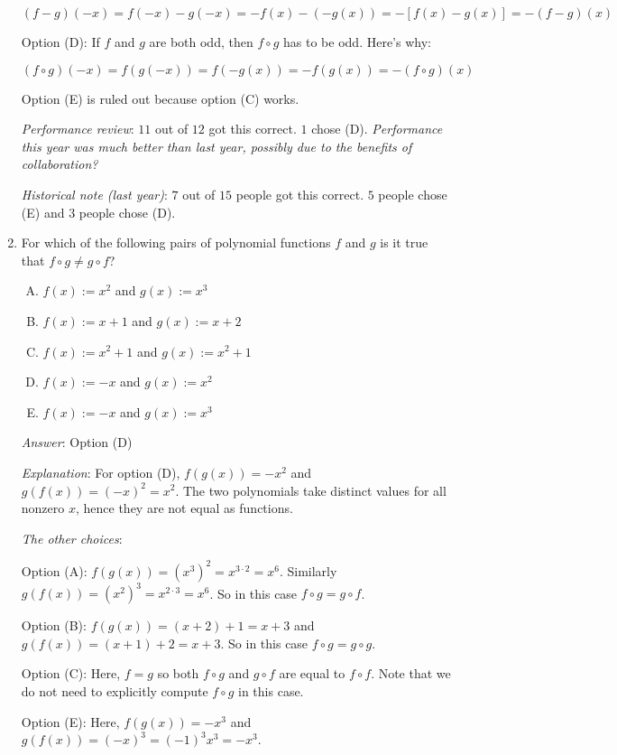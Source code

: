 \documentclass[10pt]{amsart}
\begin{document}
\begin{enumerate}
  $$(f - g)(-x) = f(-x) - g(-x) = -f(x) - (-g(x)) = -[f(x) - g(x)] = -(f - g)(x)$$

  Option (D): If $f$ and $g$ are both odd, then $f \circ g$ has to be
  odd. Here's why:

  $$(f \circ g)(-x) = f(g(-x)) = f(-g(x)) = -f(g(x)) = -(f \circ g)(x)$$

  Option (E) is ruled out because option (C) works.

  {\em Performance review}: $11$ out of $12$ got this correct. $1$
  chose (D). {\em Performance this year was much better than last
  year, possibly due to the benefits of collaboration?}

  {\em Historical note (last year)}: $7$ out of $15$ people got this
  correct. $5$ people chose (E) and $3$ people chose (D).

\item For which of the following pairs of polynomial functions $f$ and
  $g$ is it true that $f \circ g \ne g \circ f$?

  \begin{enumerate}[(A)]
  \item $f(x) := x^2$ and $g(x) := x^3$
  \item $f(x) := x + 1$ and $g(x) := x + 2$
  \item $f(x) := x^2 + 1$ and $g(x) := x^2 + 1$
  \item $f(x) := -x$ and $g(x) := x^2$
  \item $f(x) := -x$ and $g(x) := x^3$
  \end{enumerate}

  {\em Answer}: Option (D)

  {\em Explanation}: For option (D), $f(g(x)) = -x^2$ and $g(f(x)) =
  (-x)^2 = x^2$. The two polynomials take distinct values for all
  nonzero $x$, hence they are not equal as functions.

  {\em The other choices}:

  Option (A): $f(g(x)) = (x^3)^2 = x^{3 \cdot 2} = x^6$. Similarly
  $g(f(x)) = (x^2)^3 = x^{2 \cdot 3} = x^6$. So in this case $f \circ
  g = g \circ f$.

  Option (B): $f(g(x)) = (x + 2) + 1 = x + 3$ and $g(f(x)) = (x + 1) +
  2 = x + 3$. So in this case $f \circ g = g \circ g$.

  Option (C): Here, $f = g$ so both $f \circ g$ and $g \circ f$ are
  equal to $f \circ f$. Note that we do not need to explicitly compute
  $f \circ g$ in this case.

  Option (E): Here, $f(g(x)) = -x^3$ and $g(f(x)) = (-x)^3 = (-1)^3x^3
  = -x^3$.


\end{enumerate}
\end{document}
